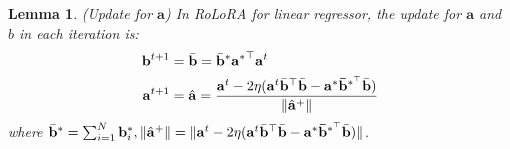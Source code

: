 \documentclass{article}
\theoremstyle{plain}
\newtheorem{lemma}[theorem]{Lemma}
\theoremstyle{definition}
\theoremstyle{remark}
\begin{document}
\begin{lemma} (Update for ${\mathbf{a}}$) \label{a-update-homo}
    In RoLoRA for linear regressor, the update for ${\mathbf{a}}$ and $b$ in each iteration is:
    \begin{align}
    \mathbf{b}^{t+1} &=\Bar{\mathbf{b}} = \Bar{\mathbf{b}}^*\mathbf{a^*}^\top \mathbf{a}^t \\
       \mathbf{a}^{t+1} &= \hat{\mathbf{a}} = \frac{\mathbf{a}^t- 2\eta (\mathbf{a}^t\Bar{\mathbf{b}}^\top\Bar{\mathbf{b}}-\mathbf{a}^*\mathbf{\Bar{b}}^{*^\top}\Bar{\mathbf{b}})}{\lVert \hat{\mathbf{a}}^{+} \rVert}
    \end{align}
where $\Bar{\mathbf{b}}^* = \sum_{i=1}^{N} \mathbf{b}_i^*, \lVert \hat{\mathbf{a}}^{+}\rVert =  \lVert \mathbf{a}^t- 2\eta (\mathbf{a}^t\Bar{\mathbf{b}}^\top\Bar{\mathbf{b}}-\mathbf{a}^*\mathbf{\Bar{b}}^{*^\top}\Bar{\mathbf{b}})\rVert$.
\end{lemma}
\end{document}

